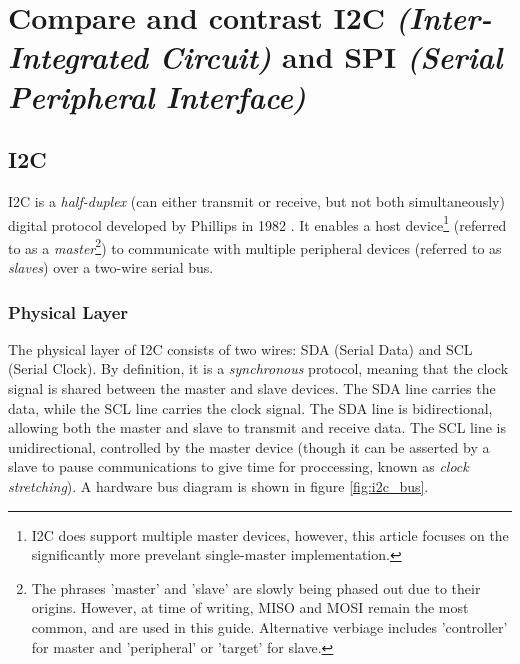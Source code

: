 \documentclass[main.tex]{subfiles}
\begin{document}
\section{Compare and contrast I2C \textit{(Inter-Integrated Circuit)} and SPI \textit{(Serial Peripheral Interface)}} \label{section:compare_i2c_spi} %
\spoilerline

\subsection{I2C}
I2C is a \textit{half-duplex} (can either transmit or receive, but not both simultaneously) digital protocol developed by Phillips in 1982 \cite{sparkfun_i2c_history}. It enables a host device\footnote{I2C does support multiple master devices, however, this article focuses on the significantly more prevelant single-master implementation.} (referred to as a \textit{master}\footnote{The phrases 'master' and 'slave' are slowly being phased out due to their origins. However, at time of writing, MISO and MOSI remain the most common, and are used in this guide. Alternative verbiage includes 'controller' for master and 'peripheral' or 'target' for slave.}) to communicate with multiple peripheral devices (referred to as \textit{slaves}) over a two-wire serial bus. 

\subsubsection{Physical Layer}
The physical layer of I2C consists of two wires: SDA (Serial Data) and SCL (Serial Clock). By definition, it is a \textit{synchronous} protocol, meaning that the clock signal is shared between the master and slave devices. The SDA line carries the data, while the SCL line carries the clock signal. The SDA line is bidirectional, allowing both the master and slave to transmit and receive data. The SCL line is unidirectional, controlled by the master device (though it can be asserted by a slave to pause communications to give time for proccessing, known as \textit{clock stretching}). A hardware bus diagram is shown in figure \ref{fig:i2c_bus}.
\end{document}
